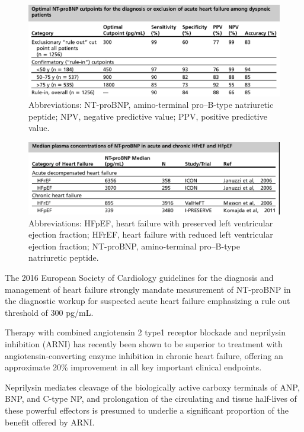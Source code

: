 \documentclass[14pt,a4paper,onecolumn]{extarticle}
\begin{document}
\begin{figure}   \includegraphics{../../images/NTBNP_cutpoints.png}   \caption{Abbreviations: NT-proBNP, amino-terminal pro–B-type natriuretic peptide; NPV, negative predictive value; PPV, positive predictive value.\citep{Januzzi2006a}}   \label{NTBNP_cutpoints} \end{figure} %

\begin{figure}   \includegraphics{../../images/NTBNP_HF.png}   \caption{Abbreviations: HFpEF, heart failure with preserved left ventricular ejection fraction; HFrEF, heart failure with reduced left ventricular ejection fraction; NT-proBNP, amino-terminal pro–B-type natriuretic peptide. \citep{Richards2018}}   \label{NTBNP_HF} \end{figure} %

The 2016 European Society of Cardiology guidelines for the diagnosis and management of heart failure strongly mandate measurement of NT-proBNP in the diagnostic workup for suspected acute heart failure emphasizing a rule out threshold of 300 pg/mL. \citep{Ponikowski2016} %

Therapy with combined angiotensin 2 type1 receptor blockade and neprilysin inhibition (ARNI) has recently been shown to be superior to treatment with angiotensin-converting enzyme inhibition in chronic heart failure, offering an approximate 20\% improvement in all key important clinical endpoints. \citep{McMurray2014} %

Neprilysin mediates cleavage of the biologically active carboxy terminals of ANP, BNP, and C-type NP, and prolongation of the circulating and tissue half-lives of these powerful effectors is presumed to underlie a significant proportion of the benefit offered by ARNI. \citep{Bayes-Genis2016} %
\end{document}
